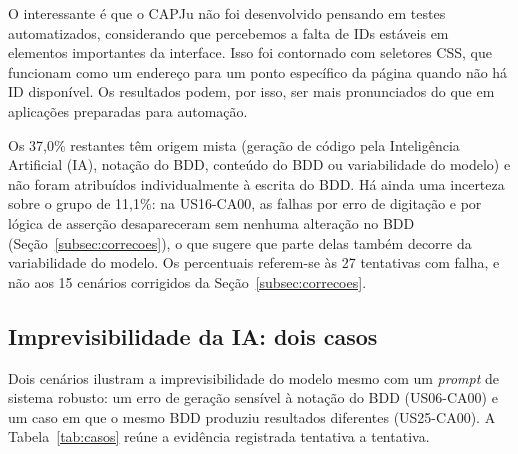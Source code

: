 O interessante é que o CAPJu não foi desenvolvido pensando em testes automatizados, considerando que percebemos a falta de IDs estáveis em elementos importantes da interface. Isso foi contornado com seletores CSS, que funcionam como um endereço para um ponto específico da página quando não há ID disponível. Os resultados podem, por isso, ser mais pronunciados do que em aplicações preparadas para automação.

Os 37,0\% restantes têm origem mista (geração de código pela Inteligência Artificial (IA), notação do BDD, conteúdo do BDD ou variabilidade do modelo) e não foram atribuídos individualmente à escrita do BDD. Há ainda uma incerteza sobre o grupo de 11,1\%: na US16-CA00, as falhas por erro de digitação e por lógica de asserção desapareceram sem nenhuma alteração no BDD (Seção~\ref{subsec:correcoes}), o que sugere que parte delas também decorre da variabilidade do modelo. Os percentuais referem-se às 27 tentativas com falha, e não aos 15 cenários corrigidos da Seção~\ref{subsec:correcoes}.

\subsection{Imprevisibilidade da IA: dois casos}
\label{subsec:imprevisibilidade}

Dois cenários ilustram a imprevisibilidade do modelo mesmo com um \textit{prompt} de sistema robusto: um erro de geração sensível à notação do BDD (US06-CA00) e um caso em que o mesmo BDD produziu resultados diferentes (US25-CA00). A Tabela~\ref{tab:casos} reúne a evidência registrada tentativa a tentativa.


